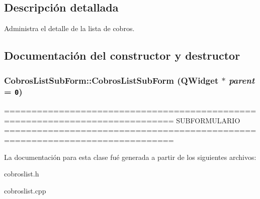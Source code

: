 \subsection{Descripci\'{o}n detallada}
Administra el detalle de la lista de cobros. 



\subsection{Documentaci\'{o}n del constructor y destructor}
\subsubsection{\setlength{\rightskip}{0pt plus 5cm}Cobros\-List\-Sub\-Form::Cobros\-List\-Sub\-Form (QWidget $\ast$ {\em parent} = {\tt 0})}\label{classCobrosListSubForm_a0}


============================================================================= SUBFORMULARIO ============================================================================= 

La documentaci\'{o}n para esta clase fu\'{e} generada a partir de los siguientes archivos:\begin{CompactItemize}
\item 
cobroslist.h\item 
cobroslist.cpp\end{CompactItemize}
